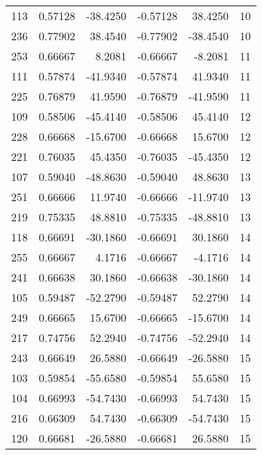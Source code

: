\begin{tabular}{rrrrrr}
113 &  0.57128 & -38.4250 &    -0.57128 &     38.4250 &  10 \\
236 &  0.77902 &  38.4540 &    -0.77902 &    -38.4540 &  10 \\
253 &  0.66667 &   8.2081 &    -0.66667 &     -8.2081 &  11 \\
111 &  0.57874 & -41.9340 &    -0.57874 &     41.9340 &  11 \\
225 &  0.76879 &  41.9590 &    -0.76879 &    -41.9590 &  11 \\
109 &  0.58506 & -45.4140 &    -0.58506 &     45.4140 &  12 \\
228 &  0.66668 & -15.6700 &    -0.66668 &     15.6700 &  12 \\
221 &  0.76035 &  45.4350 &    -0.76035 &    -45.4350 &  12 \\
107 &  0.59040 & -48.8630 &    -0.59040 &     48.8630 &  13 \\
251 &  0.66666 &  11.9740 &    -0.66666 &    -11.9740 &  13 \\
219 &  0.75335 &  48.8810 &    -0.75335 &    -48.8810 &  13 \\
118 &  0.66691 & -30.1860 &    -0.66691 &     30.1860 &  14 \\
255 &  0.66667 &   4.1716 &    -0.66667 &     -4.1716 &  14 \\
241 &  0.66638 &  30.1860 &    -0.66638 &    -30.1860 &  14 \\
105 &  0.59487 & -52.2790 &    -0.59487 &     52.2790 &  14 \\
249 &  0.66665 &  15.6700 &    -0.66665 &    -15.6700 &  14 \\
217 &  0.74756 &  52.2940 &    -0.74756 &    -52.2940 &  14 \\
243 &  0.66649 &  26.5880 &    -0.66649 &    -26.5880 &  15 \\
103 &  0.59854 & -55.6580 &    -0.59854 &     55.6580 &  15 \\
104 &  0.66993 & -54.7430 &    -0.66993 &     54.7430 &  15 \\
216 &  0.66309 &  54.7430 &    -0.66309 &    -54.7430 &  15 \\
120 &  0.66681 & -26.5880 &    -0.66681 &     26.5880 &  15 \\
\bottomrule
\end{tabular}
